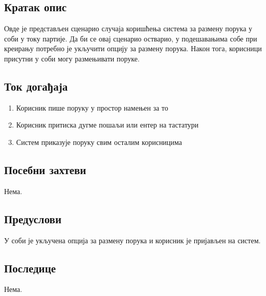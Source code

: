 \subsection{Кратак опис}
Овде је представљен сценарио случаја коришћења система за размену порука у соби у току
партије. Да би се овај сценарио остварио, у подешавањима собе при креирању потребно је
укључити опцију за размену порука. Након тога, корисници присутни у соби могу 
размењивати поруке.
 
\subsection{Ток догађаја}
\begin{enumerate}
	\item Корисник пише поруку у простор намењен за то
	\item Корисник притиска дугме пошаљи или ентер на тастатури
	\item Систем приказује поруку свим осталим корисницима
\end{enumerate}

\subsection{Посебни захтеви}
Нема.

\subsection{Предуслови}
У соби је укључена опција за размену порука и корисник је пријављен на систем.

\subsection{Последице}
Нема.
